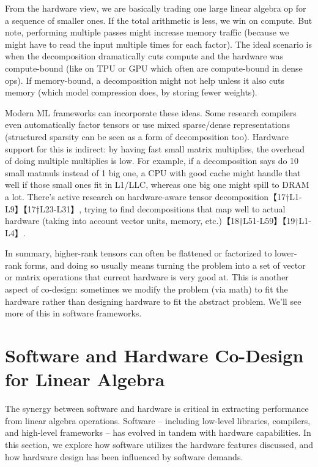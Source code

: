 From the hardware view, we are basically trading one large linear algebra op for a sequence of smaller ones. If the total arithmetic is less, we win on compute. But note, performing multiple passes might increase memory traffic (because we might have to read the input multiple times for each factor). The ideal scenario is when the decomposition dramatically cuts compute and the hardware was compute-bound (like on TPU or GPU which often are compute-bound in dense ops). If memory-bound, a decomposition might not help unless it also cuts memory (which model compression does, by storing fewer weights).

Modern ML frameworks can incorporate these ideas. Some research compilers even automatically factor tensors or use mixed sparse/dense representations (structured sparsity can be seen as a form of decomposition too). Hardware support for this is indirect: by having fast small matrix multiplies, the overhead of doing multiple multiplies is low. For example, if a decomposition says do 10 small matmuls instead of 1 big one, a CPU with good cache might handle that well if those small ones fit in L1/LLC, whereas one big one might spill to DRAM a lot. There’s active research on hardware-aware tensor decomposition【17†L1-L9】【17†L23-L31】, trying to find decompositions that map well to actual hardware (taking into account vector units, memory, etc.)【18†L51-L59】【19†L1-L4】.

In summary, higher-rank tensors can often be flattened or factorized to lower-rank forms, and doing so usually means turning the problem into a set of vector or matrix operations that current hardware is very good at. This is another aspect of co-design: sometimes we modify the problem (via math) to fit the hardware rather than designing hardware to fit the abstract problem. We’ll see more of this in software frameworks.

\section{Software and Hardware Co-Design for Linear Algebra}  
The synergy between software and hardware is critical in extracting performance from linear algebra operations. Software – including low-level libraries, compilers, and high-level frameworks – has evolved in tandem with hardware capabilities. In this section, we explore how software utilizes the hardware features discussed, and how hardware design has been influenced by software demands.

